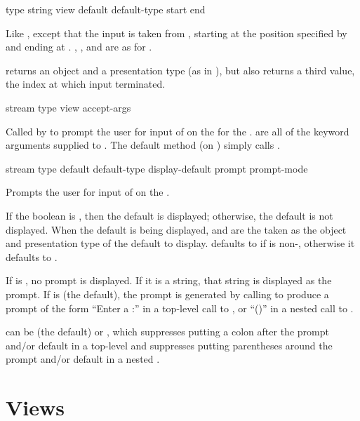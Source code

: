  {type string \key view default default-type start end}

Like , except that the input is taken from , starting at
the position specified by  and ending at .  ,
, and  are as for .

 returns an object and a presentation type (as in
), but also returns a third value, the index at which input
terminated.


 {stream type view \rest accept-args \key}

Called by  to prompt the user for input of 
 on the   for the  .
 are all of the keyword arguments supplied to .  The
default method (on ) simply calls
.

 {stream type
                              \key default default-type display-default
                                   prompt prompt-mode
                              \allow}

Prompts the user for input of   on the
 .

If the boolean  is , then the default is
displayed; otherwise, the default is not displayed.  When the default is being
displayed,  and  are the taken as the object and
presentation type of the default to display.  defaults to
 if  is non-, otherwise it defaults to
.

If  is , no prompt is displayed.  If it is a string, that
string is displayed as the prompt.  If  is  (the default), the
prompt is generated by calling  to produce a
prompt of the form ``Enter a :'' in a top-level call to ,
or ``()'' in a nested call to .

 can be  (the default) or , which
suppresses putting a colon after the prompt and/or default in a top-level
 and suppresses putting parentheses around the prompt and/or default
in a nested .


\section {Views}


